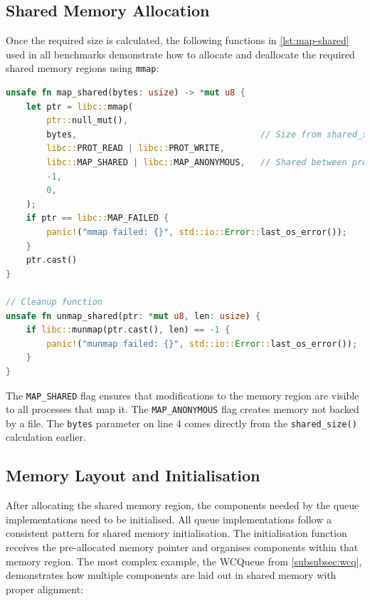 \subsection{Shared Memory Allocation}

Once the required size is calculated, the following functions in \cref{lst:map-shared} used in all benchmarks demonstrate how to allocate and deallocate the required shared memory regions using \texttt{mmap}:

\begin{lstlisting}[language=Rust, style=boxed, caption={Shared memory allocation using mmap}, label={lst:map-shared}]
unsafe fn map_shared(bytes: usize) -> *mut u8 {
    let ptr = libc::mmap(
        ptr::null_mut(),
        bytes,                                    // Size from shared_size()
        libc::PROT_READ | libc::PROT_WRITE,
        libc::MAP_SHARED | libc::MAP_ANONYMOUS,   // Shared between processes
        -1,
        0,
    );
    if ptr == libc::MAP_FAILED {
        panic!("mmap failed: {}", std::io::Error::last_os_error());
    }
    ptr.cast()
}

// Cleanup function
unsafe fn unmap_shared(ptr: *mut u8, len: usize) {
    if libc::munmap(ptr.cast(), len) == -1 {
        panic!("munmap failed: {}", std::io::Error::last_os_error());
    }
}
\end{lstlisting}

The \texttt{MAP\_SHARED} flag ensures that modifications to the memory region are visible to all processes that map it. The \texttt{MAP\_ANONYMOUS} flag creates memory not backed by a file. The \texttt{bytes} parameter on line 4 comes directly from the \texttt{shared\_size()} calculation earlier.

\subsection{Memory Layout and Initialisation}

After allocating the shared memory region, the components needed by the queue implementations need to be initialised. All queue implementations follow a consistent pattern for shared memory initialisation. The initialisation function receives the pre-allocated memory pointer and organises components within that memory region. The most complex example, the WCQueue from \cref{subsubsec:wcq}, demonstrates how multiple components are laid out in shared memory with proper alignment:

